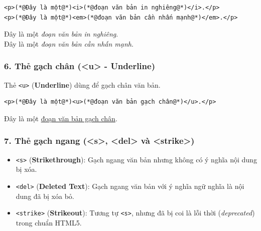 \documentclass[11pt,oneside]{book}
\newcommand{\codeinline}[1]{\textcolor{accentOrange}{\texttt{#1}}}
\begin{document}
\begin{codeWindow}
\begin{lstlisting}[language=HTML5]
<p>(*@Đây là một@*)<i>(*@đoạn văn bản in nghiêng@*)</i>.</p>
<p>(*@Đây là một@*)<em>(*@đoạn văn bản cần nhấn mạnh@*)</em>.</p>
\end{lstlisting}
\end{codeWindow}
\begin{tcolorbox}[
    enhanced,
    colback=white,
    colframe=primaryBlue!20,
    arc=6pt,
    boxrule=0.8pt,
    drop shadow=black!3!white,
    top=8pt, bottom=8pt, left=12pt, right=12pt,
    title={\sffamily\bfseries\scriptsize\color{codeComment} KẾT QUẢ HIỂN THỊ TRÊN TRÌNH DUYỆT (BROWSER PREVIEW)},
    coltitle=codeComment,
    colbacktitle=codeBg!80!white
]
Đây là một \textit{đoạn văn bản in nghiêng}.\\[3pt]
Đây là một \textit{đoạn văn bản cần nhấn mạnh}.
\end{tcolorbox}


\subsubsection{6. Thẻ gạch chân (<u> - Underline)}

Thẻ \codeinline{<u>} (\textbf{Underline}) dùng để gạch chân văn bản.

\begin{codeWindow}
\begin{lstlisting}[language=HTML5]
<p>(*@Đây là một@*)<u>(*@đoạn văn bản gạch chân@*)</u>.</p>
\end{lstlisting}
\end{codeWindow}
\begin{tcolorbox}[
    enhanced,
    colback=white,
    colframe=primaryBlue!20,
    arc=6pt,
    boxrule=0.8pt,
    drop shadow=black!3!white,
    top=8pt, bottom=8pt, left=12pt, right=12pt,
    title={\sffamily\bfseries\scriptsize\color{codeComment} KẾT QUẢ HIỂN THỊ TRÊN TRÌNH DUYỆT (BROWSER PREVIEW)},
    coltitle=codeComment,
    colbacktitle=codeBg!80!white
]
Đây là một \underline{đoạn văn bản gạch chân}.
\end{tcolorbox}


\subsubsection{7. Thẻ gạch ngang (<s>, <del> và <strike>)}

\begin{itemize}[leftmargin=1.8em, itemsep=3pt, parsep=0pt]
    \item \codeinline{<s>} (\textbf{Strikethrough}): Gạch ngang văn bản nhưng không có ý nghĩa nội dung bị xóa.
    \item \codeinline{<del>} (\textbf{Deleted Text}): Gạch ngang văn bản với ý nghĩa ngữ nghĩa là nội dung đã bị xóa bỏ.
    \item \codeinline{<strike>} (\textbf{Strikeout}): Tương tự \codeinline{<s>}, nhưng đã bị coi là lỗi thời (\textit{deprecated}) trong chuẩn HTML5.
\end{itemize}
\end{document}
